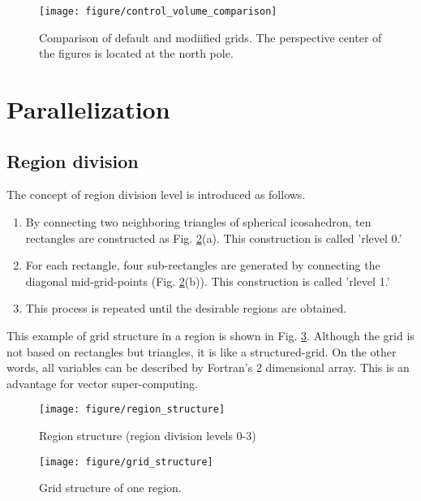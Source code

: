 \begin{figure}[H]
  \begin{center}
    \texttt{[image: figure/control\_volume\_comparison]}
    \caption{Comparison of default and modiified grids. The perspective
      center of the figures is located at the north pole.}
    \label{fig:scale-gm_control_volume_comparison}
  \end{center}
\end{figure}



\section{Parallelization}
\subsection{Region division}
The concept of region division level is introduced as follows.
\begin{enumerate}
  \item By connecting two neighboring triangles of spherical icosahedron, ten
    rectangles are constructed as Fig. \ref{fig:scale-gm_region_structure}(a). This construction is called 'rlevel
    0.'
  \item For each rectangle, four sub-rectangles are generated by connecting
    the diagonal mid-grid-points (Fig. \ref{fig:scale-gm_region_structure}(b)). This construction is called
    'rlevel 1.'
  \item This process is repeated until the desirable regions are obtained.
\end{enumerate}
This example of grid structure in a region is shown in Fig. \ref{fig:scale-gm_grid_structure}. Although the
grid is not based on rectangles but triangles, it is like a
structured-grid. On the other words, all variables can be described by
Fortran's 2 dimensional array. This is an advantage for vector super-computing.

\begin{figure}[H]
  \begin{center}
    \texttt{[image: figure/region\_structure]}
    \caption{Region structure (region division levels 0-3)}
    \label{fig:scale-gm_region_structure}
  \end{center}
\end{figure}

\begin{figure}[H]
  \begin{center}
    \texttt{[image: figure/grid\_structure]}
    \caption{Grid structure of one region.}
    \label{fig:scale-gm_grid_structure}
  \end{center}
\end{figure}


